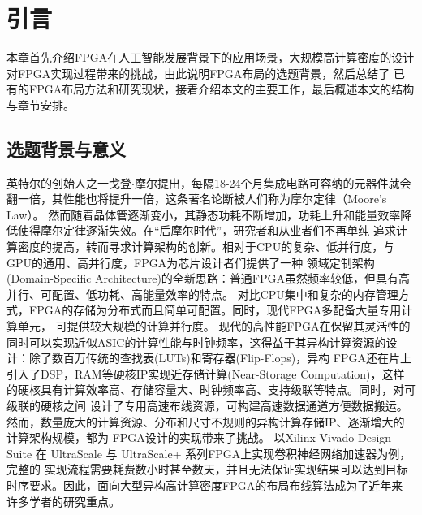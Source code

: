 \chapter{引言}

本章首先介绍FPGA在人工智能发展背景下的应用场景，大规模高计算密度的设计对FPGA实现过程带来的挑战，由此说明FPGA布局的选题背景，然后总结了
已有的FPGA布局方法和研究现状，接着介绍本文的主要工作，最后概述本文的结构与章节安排。

\section{选题背景与意义}

英特尔的创始人之一戈登$\cdot$摩尔提出，每隔18-24个月集成电路可容纳的元器件就会翻一倍，其性能也将提升一倍，这条著名论断被人们称为摩尔定律（Moore's Law）。
然而随着晶体管逐渐变小，其静态功耗不断增加，功耗上升和能量效率降低使得摩尔定律逐渐失效。在“后摩尔时代”，研究者和从业者们不再单纯
追求计算密度的提高，转而寻求计算架构的创新。相对于CPU的复杂、低并行度，与GPU的通用、高并行度，FPGA为芯片设计者们提供了一种
领域定制架构(Domain-Specific Architecture)的全新思路：普通FPGA虽然频率较低，但具有高并行、可配置、低功耗、高能量效率的特点。
对比CPU集中和复杂的内存管理方式，FPGA的存储为分布式而且简单可配置。同时，现代FPGA多配备大量专用计算单元，
可提供较大规模的计算并行度。
现代的高性能FPGA在保留其灵活性的同时可以实现近似ASIC的计算性能与时钟频率，这得益于其异构计算资源的设计：除了数百万传统的查找表(LUTs)和寄存器(Flip-Flops)，异构
FPGA还在片上引入了DSP，RAM等硬核IP实现近存储计算(Near-Storage Computation)，这样的硬核具有计算效率高、存储容量大、时钟频率高、支持级联等特点。同时，对可级联的硬核之间
设计了专用高速布线资源，可构建高速数据通道方便数据搬运。然而，数量庞大的计算资源、分布和尺寸不规则的异构计算存储IP、逐渐增大的计算架构规模，都为
FPGA设计的实现带来了挑战。
以Xilinx Vivado Design Suite 在 UltraScale 与 UltraScale+ 系列FPGA上实现卷积神经网络加速器为例，完整的
实现流程需要耗费数小时甚至数天，并且无法保证实现结果可以达到目标时序要求。因此，面向大型异构高计算密度FPGA的布局布线算法成为了近年来
许多学者的研究重点。

